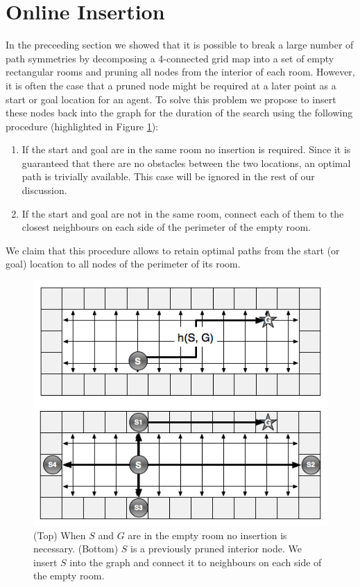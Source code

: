 \section{Online Insertion}
In the preceeding section we showed that it is possible to break a large 
number of path symmetries by decomposing a 4-connected grid map into 
a set of empty rectangular rooms and pruning all nodes from the interior of
each room.
However, it is often the case that a pruned node might be required at a later
point as a start or goal location for an agent.
To solve this problem we propose to insert these  nodes
back into the graph for the duration of the search using the following procedure (highlighted in Figure \ref{fig:insertion}):
\begin{enumerate}
\item{If the start and goal are in the same room no insertion is required.
 Since it is guaranteed that there are no obstacles between the two locations, an optimal 
 path is trivially available. This case will be ignored in the rest of our discussion.}
\item{If the start and goal are not in the same room, connect each of them
to the closest neighbours on each side of the perimeter of the empty room.}
\end{enumerate}
We claim that this procedure allows to retain optimal paths from the start (or goal) location
to all nodes of the perimeter of its room.

\begin{figure}[t]
	\vspace{-4pt}
       \begin{center}
           \includegraphics[scale=0.50, trim = 10mm 10mm 10mm 0mm]{diagrams/roomtraversal.png}
       \end{center}
	\vspace{-3pt}
       \caption{(Top) When $S$ and $G$ are in the empty room no insertion is necessary.
				(Bottom) $S$ is a previously pruned interior node.
				We insert $S$ into the graph and connect it to neighbours on each side of the empty room.}
	\label{fig:insertion}
\end{figure}

